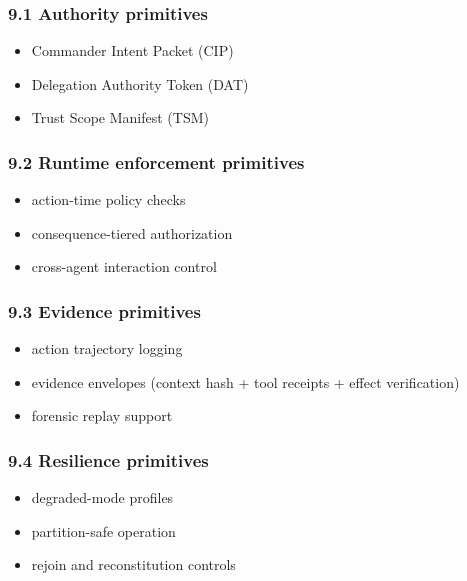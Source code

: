\documentclass[11pt]{article}
\begin{document}
\hypertarget{authority-primitives}{%
\subsubsection{9.1 Authority primitives}\label{authority-primitives}}

\begin{itemize}
\tightlist
\item
  Commander Intent Packet (CIP)
\item
  Delegation Authority Token (DAT)
\item
  Trust Scope Manifest (TSM)
\end{itemize}

\hypertarget{runtime-enforcement-primitives}{%
\subsubsection{9.2 Runtime enforcement
primitives}\label{runtime-enforcement-primitives}}

\begin{itemize}
\tightlist
\item
  action-time policy checks
\item
  consequence-tiered authorization
\item
  cross-agent interaction control
\end{itemize}

\hypertarget{evidence-primitives}{%
\subsubsection{9.3 Evidence primitives}\label{evidence-primitives}}

\begin{itemize}
\tightlist
\item
  action trajectory logging
\item
  evidence envelopes (context hash + tool receipts + effect
  verification)
\item
  forensic replay support
\end{itemize}

\hypertarget{resilience-primitives}{%
\subsubsection{9.4 Resilience primitives}\label{resilience-primitives}}

\begin{itemize}
\tightlist
\item
  degraded-mode profiles
\item
  partition-safe operation
\item
  rejoin and reconstitution controls
\end{itemize}
\end{document}
